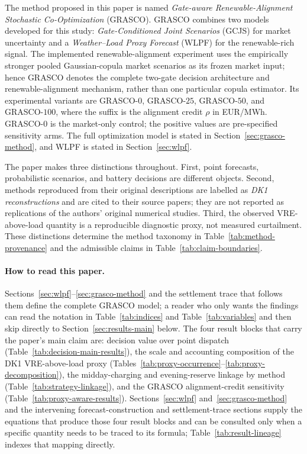 \documentclass[11pt,a4paper]{article}
\begin{document}
The method proposed in this paper is named \emph{Gate-aware
Renewable-Alignment Stochastic Co-Optimization} (GRASCO).  GRASCO combines
two models developed for this study: \emph{Gate-Conditioned Joint Scenarios}
(GCJS) for market uncertainty and a \emph{Weather--Load Proxy Forecast}
(WLPF) for the renewable-rich signal.  The implemented renewable-alignment
experiment uses the empirically stronger pooled Gaussian-copula market
scenarios as its frozen market input; hence GRASCO denotes the complete
two-gate decision architecture and renewable-alignment mechanism, rather than
one particular copula estimator.  Its experimental variants are
GRASCO-$0$, GRASCO-$25$, GRASCO-$50$, and GRASCO-$100$, where the suffix is
the alignment credit $\rho$ in EUR/MWh.  GRASCO-$0$ is the market-only
control; the positive values are pre-specified sensitivity arms.  The full
optimization model is stated in Section~\ref{sec:grasco-method}, and WLPF is
stated in Section~\ref{sec:wlpf}.

The paper makes three distinctions throughout.  First, point forecasts,
probabilistic scenarios, and battery decisions are different objects.  Second,
methods reproduced from their original descriptions are labelled as
\emph{DK1 reconstructions} and are cited to their source papers; they are not
reported as replications of the authors' original numerical studies.  Third,
the observed VRE-above-load quantity is a reproducible diagnostic proxy, not
measured curtailment.  These distinctions determine the method taxonomy in
Table~\ref{tab:method-provenance} and the admissible claims in
Table~\ref{tab:claim-boundaries}.

\paragraph{How to read this paper.}
Sections~\ref{sec:wlpf}--\ref{sec:grasco-method} and the settlement trace that
follows them define the complete GRASCO model; a reader who only wants the
findings can read the notation in Table~\ref{tab:indices} and Table~\ref{tab:variables}
and then skip directly to Section~\ref{sec:results-main} below.  The four
result blocks that carry the paper's main claim are: decision value over
point dispatch (Table~\ref{tab:decision-main-results}), the scale and
accounting composition of the DK1 VRE-above-load proxy
(Tables~\ref{tab:proxy-occurrence}--\ref{tab:proxy-decomposition}), the
midday-charging and evening-reserve linkage by method
(Table~\ref{tab:strategy-linkage}), and the GRASCO alignment-credit
sensitivity (Table~\ref{tab:proxy-aware-results}).  Sections~\ref{sec:wlpf}
and~\ref{sec:grasco-method} and the intervening forecast-construction and
settlement-trace sections supply the equations that produce those four result
blocks and can be consulted only when a specific quantity needs to be traced
to its formula; Table~\ref{tab:result-lineage} indexes that mapping directly.
\end{document}
